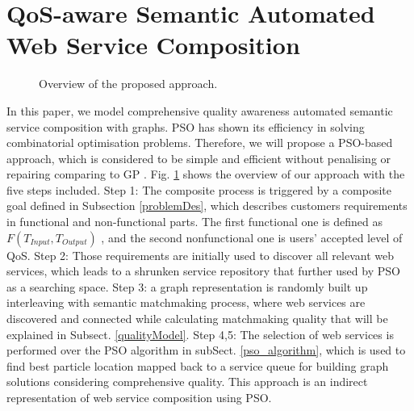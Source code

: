 \documentclass{llncs}
\begin{document}
\section{QoS-aware Semantic Automated Web Service Composition}\label{qswsc_approach}
\begin{figure}[h]
\centerline{
}
 \caption{Overview of the proposed approach.}
 \label{overview}
\end{figure}
In this paper, we model comprehensive quality awareness automated semantic service composition with graphs. PSO has shown its efficiency in solving combinatorial optimisation problems. Therefore, we will propose a PSO-based approach, which is considered to be simple and efficient without penalising or repairing comparing to GP \cite{da2014graph}. Fig. \ref{overview} shows the overview of our approach with the five steps included. Step 1: The composite process is triggered by a composite goal defined in Subsection \ref{problemDes}, which describes customers requirements in functional and non-functional parts. The first functional one is defined as $F(T_{Input}, T_{Output})$ , and the second nonfunctional one is users' accepted level of QoS. Step 2: Those requirements are initially used to discover all relevant web services, which leads to a shrunken service repository that further used by PSO as a searching space. Step 3: a graph representation is randomly built up interleaving with semantic matchmaking process, where web services are discovered and connected while calculating matchmaking quality that will be explained in Subsect. \ref{qualityModel}. Step 4,5: The selection of web services is performed over the PSO algorithm in subSect. \ref{pso_algorithm}, which is used to find best particle location mapped back to a service queue for building graph solutions considering comprehensive quality. This approach \cite{da2016particle} is an indirect representation of web service composition using PSO.
\end{document}
